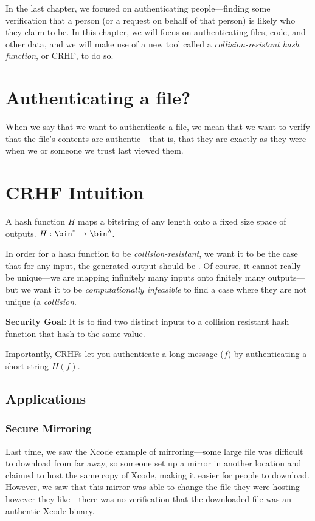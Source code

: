 In the last chapter, we focused on authenticating people---finding some verification that a person (or a request on behalf of that person) is likely who they claim to be. In this chapter, we will focus on authenticating files, code, and other data, and we will make use of a new tool called a \textit{collision-resistant hash function}, or CRHF, to do so.

\section{Authenticating a file?}
When we say that we want to authenticate a file, we mean that we want to verify that the file's contents are authentic---that is, that they are exactly as they were when we or someone we trust last viewed them.

\section{CRHF Intuition}
\begin{definition}
	A hash function $H$ maps a bitstring of any length onto a fixed size space of outputs. $H: \bin^* \rightarrow \bin^{\lambda}$.
\end{definition}

In order for a hash function to be \textit{collision-resistant}, we want it to be the case that for any input, the generated output should be . Of course, it cannot really be unique---we are mapping infinitely many inputs onto finitely many outputs---but we want it to be \textit{computationally infeasible} to find a case where they are not unique (a \textit{collision}.

\textbf{Security Goal}: It is  to find two distinct inputs to a collision resistant hash function that hash to the same value.

Importantly, CRHFs let you authenticate a long message ($f$) by authenticating a short string $H(f)$.

\subsection{Applications}
\subsubsection{Secure Mirroring}
Last time, we saw the Xcode example of mirroring---some large file was difficult to download from far away, so someone set up a mirror in another location and claimed to host the same copy of Xcode, making it easier for people to download. However, we saw that this mirror was able to change the file they were hosting however they like---there was no verification that the downloaded file was an authentic Xcode binary.

